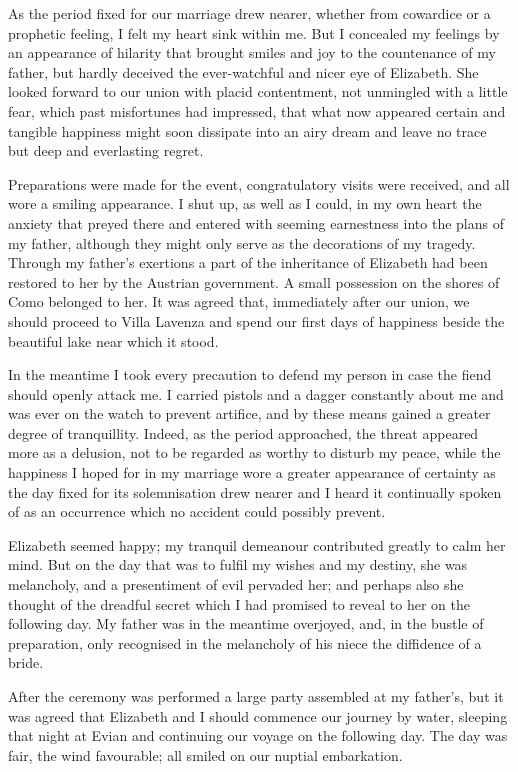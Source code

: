 \documentclass[12pt,openright]{book}
\begin{document}
As the period fixed for our marriage drew nearer, whether from cowardice or a prophetic feeling, I felt my heart sink within me. But I concealed my feelings by an appearance of hilarity that brought smiles and joy to the countenance of my father, but hardly deceived the ever-watchful and nicer eye of Elizabeth. She looked forward to our union with placid contentment, not unmingled with a little fear, which past misfortunes had impressed, that what now appeared certain and tangible happiness might soon dissipate into an airy dream and leave no trace but deep and everlasting regret.

Preparations were made for the event, congratulatory visits were received, and all wore a smiling appearance. I shut up, as well as I could, in my own heart the anxiety that preyed there and entered with seeming earnestness into the plans of my father, although they might only serve as the decorations of my tragedy. Through my father’s exertions a part of the inheritance of Elizabeth had been restored to her by the Austrian government. A small possession on the shores of Como belonged to her. It was agreed that, immediately after our union, we should proceed to Villa Lavenza and spend our first days of happiness beside the beautiful lake near which it stood.

In the meantime I took every precaution to defend my person in case the fiend should openly attack me. I carried pistols and a dagger constantly about me and was ever on the watch to prevent artifice, and by these means gained a greater degree of tranquillity. Indeed, as the period approached, the threat appeared more as a delusion, not to be regarded as worthy to disturb my peace, while the happiness I hoped for in my marriage wore a greater appearance of certainty as the day fixed for its solemnisation drew nearer and I heard it continually spoken of as an occurrence which no accident could possibly prevent.

Elizabeth seemed happy; my tranquil demeanour contributed greatly to calm her mind. But on the day that was to fulfil my wishes and my destiny, she was melancholy, and a presentiment of evil pervaded her; and perhaps also she thought of the dreadful secret which I had promised to reveal to her on the following day. My father was in the meantime overjoyed, and, in the bustle of preparation, only recognised in the melancholy of his niece the diffidence of a bride.

After the ceremony was performed a large party assembled at my father’s, but it was agreed that Elizabeth and I should commence our journey by water, sleeping that night at Evian and continuing our voyage on the following day. The day was fair, the wind favourable; all smiled on our nuptial embarkation.
\end{document}
